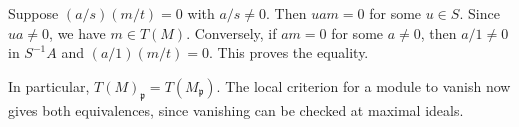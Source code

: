 Suppose $(a/s)(m/t)=0$ with $a/s\ne0$. Then $uam=0$ for some $u\in S$. Since $ua\ne0$, we have $m\in T(M)$. Conversely, if $am=0$ for some $a\ne0$, then $a/1\ne0$ in $S^{-1}A$ and $(a/1)(m/t)=0$. This proves the equality.

In particular, $T(M)_{\mathfrak p}=T(M_{\mathfrak p})$. The local criterion for a module to vanish now gives both equivalences, since vanishing can be checked at maximal ideals.
